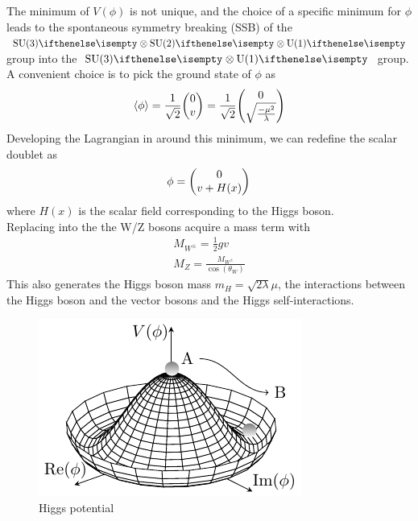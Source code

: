 The minimum of $V(\phi)$ is not unique, and the choice of a specific minimum for $\phi$ leads to the spontaneous symmetry breaking (SSB) of the $\SU{3} \otimes \SU{2} \otimes \U{1}$ group into the $\SU{3} \otimes \U{1}$ group.\\
A convenient choice is to pick the ground state of $\phi$ as
\begin{equation}
    \langle\phi\rangle=\frac{1}{\sqrt{2}}\db{0}{v}=\frac{1}{\sqrt{2}}\db{0}{\sqrt{\frac{-\mu^2}{\lambda}}}
\end{equation}
Developing the Lagrangian in  around this minimum, we can redefine the scalar doublet as
\begin{equation}\label{eq:higgs_intro}
    \phi=\db{0}{v+H(x)}
\end{equation}
where $H(x)$ is the scalar field corresponding to the Higgs boson. \\
Replacing  into the  the W/Z bosons acquire a mass term with
\begin{gather}
    M_{W^\pm}=\frac{1}{2}gv\\
    M_Z=\frac{M_{W^\pm}}{\cos (\theta_W)}
\end{gather}
This also generates the Higgs boson mass $m_H=\sqrt{2\lambda}\mu$, the interactions between the Higgs boson and the vector bosons and the Higgs self-interactions.
\begin{figure}[h!]
    \centering
    \includegraphics[width=0.7\linewidth]{fig/chap02-theory/higgs.pdf}
    \caption{Higgs potential \cite{HiggsTikZ.net}}
    \label{fig:HiggsPotential}
\end{figure}\\
